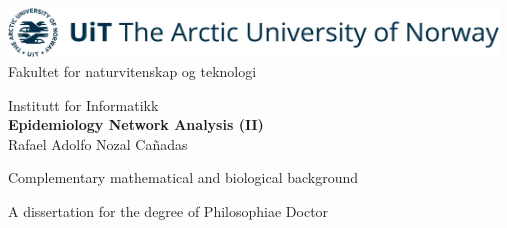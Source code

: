 \documentclass[12pt,twoside,a4paper,fleqn, english]{report}
\begin{document}
\pagestyle{empty}
\begin{center}
    \parbox[c][\textheight][t]{\textwidth}{
    
        \vspace{-2cm}
        \begin{left}

            \includegraphics[width=13cm]{figures/Others/UiT_Logo_Eng_Bla_RGB.png}\\

            \setlength{\parindent}{4em}                 %
            \vspace{0.6cm}
            \large Fakultet for naturvitenskap og teknologi \par
            \large Institutt for Informatikk \\

            \vspace{0.15cm}
            \Large \textbf{Epidemiology Network Analysis (II)}\\

            \vspace{0.05cm}
            \normalsize Rafael Adolfo Nozal Cañadas \par  
            \normalsize Complementary mathematical and biological background
            
            A dissertation for the degree of Philosophiae Doctor  \\ 
            

\end{left}}
\end{center}
\end{document}
